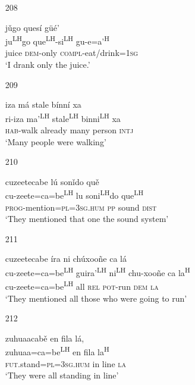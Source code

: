 \begin{itemize}
\item [208]

\glll j\v{u}go ques\'{i} g\"{u}\'{e}'\\
ju\textsuperscript{LH}go que\textsuperscript{LH}-si\textsuperscript{LH} gu-e=a'\textsuperscript{H}\\
juice \textsc{dem}-only \textsc{compl}-eat/drink=\textsc{1sg}\\
\glt `I drank only the juice.'  



\item[209]
 
\glll   iza m\'{a} stale b\'{i}nn\'{i} xa\\
ri-iza ma'\textsuperscript{LH} stale\textsuperscript{LH} binni\textsuperscript{LH} xa\\
\textsc{hab}-walk already many person \textsc{intj}\\
\glt `Many people were walking'
 


\item[210]
 
\glll   cuzeetecabe l\'{u} son\v{i}do qu\v{e}\\
 cu-zeete=ca=be\textsuperscript{LH} lu soni\textsuperscript{LH}do que\textsuperscript{LH}\\
\textsc{prog}-mention=\textsc{pl}=\textsc{3sg.hum} \textsc{pp} sound \textsc{dist}\\
\glt `They mentioned that one the sound system'
 



\item[211]
 
\glll   cuzeetecabe \'{i}ra ni ch\'{u}xoo\~{n}e ca l\'{a}\\
cu-zeete=ca=be\textsuperscript{LH} guira'\textsuperscript{LH} ni\textsuperscript{LH} chu-xoo\~{n}e ca la\textsuperscript{H}\\
cu-zeete=ca=be\textsuperscript{LH} all \textsc{rel} \textsc{pot}-run \textsc{dem} \textsc{la}\\
\glt `They mentioned all those who were going to run'
 


\item[212]
 
\glll   zuhuaacab\v{e} en fila l\'{a}, \\
zuhuaa=ca=be\textsuperscript{LH}  en fila la\textsuperscript{H}\\
\textsc{fut}.stand=\textsc{pl}=\textsc{3sg.hum} in line \textsc{la}\\
\glt `They were all standing in line'
 



\end{itemize}
